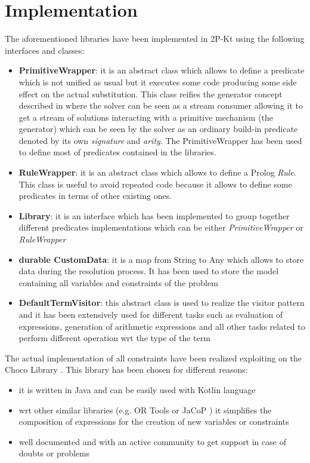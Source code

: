 \section{Implementation}\label{sec:Implementation}

The aforementioned libraries have been implemented in 2P-Kt using the following interfaces and classes:
\begin{itemize}
    \item \textbf{PrimitiveWrapper}: it is an abstract class which allows to define a predicate which is not unified as usual but it executes some code producing some
    side effect on the actual substitution. This class reifies the generator concept described in \cite{10.1007/978-3-030-75775-5_27}
    where the solver can be seen as a stream consumer allowing it to get a stream of solutions interacting with a primitive mechanism (the generator)
    which can be seen by the solver as an ordinary build-in predicate denoted by its own \textit{signature} and \textit{arity}. The PrimitiveWrapper has been used to define most of predicates contained in the libraries.
    \item \textbf{RuleWrapper}: it is an abstract class which allows to define a Prolog \textit{Rule}. This class is useful to avoid
    repeated code because it allows to define some predicates in terms of other existing ones.
    \item \textbf{Library}: it is an interface which has been implemented to group together different predicates implementations which
    can be either \textit{PrimitiveWrapper} or \textit{RuleWrapper}
    \item \textbf{durable CustomData}: it is a map from String to Any which allows to store data during the resolution process. It has been used to store the
    model containing all variables and constraints of the problem
    \item \textbf{DefaultTermVisitor}: this abstract class is used to realize the visitor pattern \cite{gamma1994design} and it has been
    extensively used for different tasks such as evaluation of expressions, generation of arithmetic expressions and all other tasks related to perform different operation wrt the type of the term
\end{itemize}


The actual implementation of all constraints have been realized exploiting on the Choco Library \cite{Prud'homme2022}. This library has been chosen for different reasons:
\begin{itemize}
    \item it is written in Java and can be easily used with Kotlin language
    \item wrt other similar libraries (e.g. OR Tools \cite{ortools} or JaCoP \cite{Kuchcinski2013JaCoPJ}) it simplifies the composition of expressions for the creation of new variables or constraints
    \item well documented and with an active community to get support in case of doubts or problems
\end{itemize}

